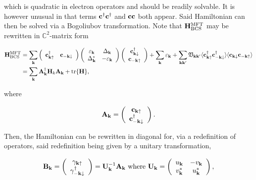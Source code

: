 \documentclass{homework}
\begin{document}
which is quadratic in electron operators and should be readily solvable. It is however unusual in that terms ${\bf c}^\dagger {\bf c}^\dagger$ and ${\bf c} {\bf c}$ both appear. Said Hamiltonian can then be solved via a Bogoliubov transformation. Note that ${\bf H}_{\textnormal{BCS}}^{\textnormal{MFT}}$ may be rewritten in $\mathds{C}^2$-matrix form 

\begin{align}
    {\bf H}_{\textnormal{BCS}}^{\textnormal{MFT}} &= \sum_{{\bf k}} \left( \begin{array}{cc}
        {\bf c}_{{\bf k}\uparrow}^\dagger & {\bf c}_{-{\bf k}\downarrow} \\ 
    \end{array} \right) \left(\begin{array}{cc}
        \varepsilon_{\bf k} &  \Delta_{{\bf k}}\\
        \Delta_{{\bf k}}^* & -\varepsilon_{\bf k}
    \end{array} \right) \left( \begin{array}{c}
        {\bf c}_{{\bf k}\downarrow}^\dagger \\
        {\bf c}_{-{\bf k}\uparrow} 
    \end{array} \right) + \sum_{{\bf k}} \varepsilon_{{\bf k}} + \sum_{{\bf k} {\bf k'}} \mathfrak{V}_{{\bf k} {\bf k'}} \langle {\bf c}_{{\bf k} \uparrow}^\dagger {\bf c}_{-{\bf k} \downarrow}^\dagger \rangle \langle {\bf c}_{{\bf k} \downarrow} {\bf c}_{-{\bf k} \uparrow} \rangle \\
    &= \sum_{{\bf k}} {\bf A}_{{\bf k}}^\dagger {\bf H}_k {\bf A}_{{\bf k}} + \tr {\bf H},
\end{align}

where 

$$
{\bf A}_{\bf k} = \left( \begin{array}{c}
     {\bf c}_{{\bf k}\uparrow}  \\
     {\bf c}_{-{\bf k}\downarrow}^\dagger  
\end{array} \right).
$$

Then, the Hamiltonian can be rewritten in diagonal for, via a redefinition of operators, said redefinition being given by a unitary transformation,

\begin{align}
    {\bf B}_{{\bf k}} = \left( \begin{array}{c}
     {\gamma}_{{\bf k}\uparrow}  \\
     {\gamma}_{-{\bf k}\downarrow}^\dagger  
\end{array} \right) = {\bf U}_{{\bf k}}^{-1} {\bf A}_{\bf k} \textnormal{ where } {\bf U}_{\bf k} = \left( \begin{array}{cc}
    u_{{\bf k}} & -v_{{\bf k}} \\
    v_{{\bf k}}^* & u_{{\bf k}}^*
\end{array} \right),
\end{align}
\end{document}
